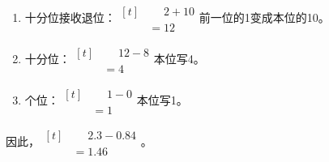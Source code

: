 {\begin{enumerate}[leftmargin=1.7em,itemsep=5pt,topsep=0pt]
\item 十分位接收退位：\(\begin{aligned}[t]&\phantom{={}}2+10\\&=12\end{aligned}\)\quad 前一位的1变成本位的10。
\item 十分位：\(\begin{aligned}[t]&\phantom{={}}12-8\\&=4\end{aligned}\)\quad 本位写4。
\item 个位：\(\begin{aligned}[t]&\phantom{={}}1-0\\&=1\end{aligned}\)\quad 本位写1。
\end{enumerate}
\par\smallskip
因此，\(\begin{aligned}[t]&\phantom{={}}2.3-0.84\\&=1.46\end{aligned}\)。
\par\medskip

}
